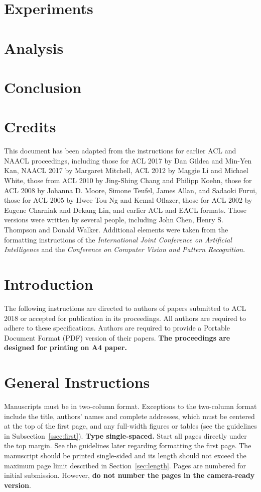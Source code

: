 \documentclass[11pt,a4paper]{article}
\begin{document}
\section{Experiments}

\section{Analysis}

\section{Conclusion}

\section{Credits}

This document has been adapted from the instructions for earlier ACL
and NAACL proceedings, including those for ACL 2017 by Dan Gildea and
Min-Yen Kan, NAACL 2017 by Margaret Mitchell, ACL 2012 by Maggie Li
and Michael White, those from ACL 2010 by Jing-Shing Chang and Philipp
Koehn, those for ACL 2008 by Johanna D. Moore, Simone Teufel, James
Allan, and Sadaoki Furui, those for ACL 2005 by Hwee Tou Ng and Kemal
Oflazer, those for ACL 2002 by Eugene Charniak and Dekang Lin, and
earlier ACL and EACL formats. Those versions were written by several
people, including John Chen, Henry S. Thompson and Donald
Walker. Additional elements were taken from the formatting
instructions of the {\em International Joint Conference on Artificial
  Intelligence} and the \emph{Conference on Computer Vision and
  Pattern Recognition}.

\section{Introduction}

The following instructions are directed to authors of papers submitted
to ACL 2018 or accepted for publication in its proceedings. All
authors are required to adhere to these specifications. Authors are
required to provide a Portable Document Format (PDF) version of their
papers. \textbf{The proceedings are designed for printing on A4
paper.}

\section{General Instructions}

Manuscripts must be in two-column format.  Exceptions to the
two-column format include the title, authors' names and complete
addresses, which must be centered at the top of the first page, and
any full-width figures or tables (see the guidelines in
Subsection~\ref{ssec:first}). \textbf{Type single-spaced.}  Start all
pages directly under the top margin. See the guidelines later
regarding formatting the first page.  The manuscript should be
printed single-sided and its length
should not exceed the maximum page limit described in Section~\ref{sec:length}.
Pages are numbered for  initial submission. However, \textbf{do not number the pages in the camera-ready version}.
\end{document}
